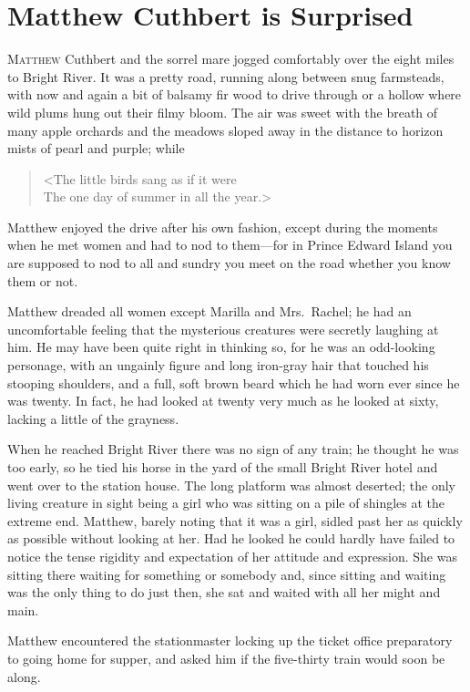 \chapter{Matthew Cuthbert is Surprised}

\lettrine{M}{atthew} Cuthbert and the sorrel mare jogged comfortably over the eight miles to Bright River. It was a pretty road, running along between snug farmsteads, with now and again a bit of balsamy fir wood to drive through or a hollow where wild plums hung out their filmy bloom. The air was sweet with the breath of many apple orchards and the meadows sloped away in the distance to horizon mists of pearl and purple; while

\begin{verse}
<The little birds sang as if it were\\
The one day of summer in all the year.>
\end{verse}

Matthew enjoyed the drive after his own fashion, except during the moments when he met women and had to nod to them—for in Prince Edward Island you are supposed to nod to all and sundry you meet on the road whether you know them or not.

Matthew dreaded all women except Marilla and Mrs.~Rachel; he had an uncomfortable feeling that the mysterious creatures were secretly laughing at him. He may have been quite right in thinking so, for he was an odd-looking personage, with an ungainly figure and long iron-gray hair that touched his stooping shoulders, and a full, soft brown beard which he had worn ever since he was twenty. In fact, he had looked at twenty very much as he looked at sixty, lacking a little of the grayness.

When he reached Bright River there was no sign of any train; he thought he was too early, so he tied his horse in the yard of the small Bright River hotel and went over to the station house. The long platform was almost deserted; the only living creature in sight being a girl who was sitting on a pile of shingles at the extreme end. Matthew, barely noting that it was a girl, sidled past her as quickly as possible without looking at her. Had he looked he could hardly have failed to notice the tense rigidity and expectation of her attitude and expression. She was sitting there waiting for something or somebody and, since sitting and waiting was the only thing to do just then, she sat and waited with all her might and main.

Matthew encountered the stationmaster locking up the ticket office preparatory to going home for supper, and asked him if the five-thirty train would soon be along.

